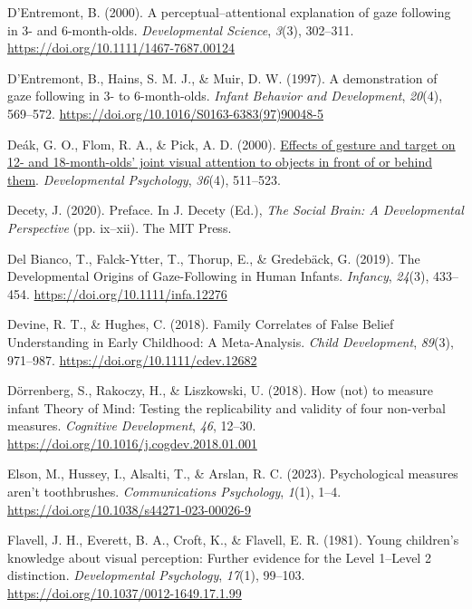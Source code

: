 \documentclass[
]{scrbook}
\newlength{\cslhangindent}
\newenvironment{CSLReferences}[2] %
 {\begin{list}{}{%
  \setlength{\itemindent}{0pt}
  \setlength{\leftmargin}{0pt}
  \setlength{\parsep}{0pt}
  \ifodd #1
   \setlength{\leftmargin}{\cslhangindent}
   \setlength{\itemindent}{-1\cslhangindent}
  \fi
  \setlength{\itemsep}{#2\baselineskip}}}
 {\end{list}}
\begin{document}
\begin{CSLReferences}{1}{0}
D'Entremont, B. (2000). A perceptual--attentional explanation of gaze following in 3- and 6-month-olds. \emph{Developmental Science}, \emph{3}(3), 302--311. \url{https://doi.org/10.1111/1467-7687.00124}

D'Entremont, B., Hains, S. M. J., \& Muir, D. W. (1997). A demonstration of gaze following in 3- to 6-month-olds. \emph{Infant Behavior and Development}, \emph{20}(4), 569--572. \url{https://doi.org/10.1016/S0163-6383(97)90048-5}

Deák, G. O., Flom, R. A., \& Pick, A. D. (2000). \href{https://www.ncbi.nlm.nih.gov/pubmed/10902702}{Effects of gesture and target on 12- and 18-month-olds' joint visual attention to objects in front of or behind them}. \emph{Developmental Psychology}, \emph{36}(4), 511--523.

Decety, J. (2020). Preface. In J. Decety (Ed.), \emph{The {Social Brain}: {A Developmental Perspective}} (pp. ix--xii). The MIT Press.

Del Bianco, T., Falck-Ytter, T., Thorup, E., \& Gredebäck, G. (2019). The {Developmental Origins} of {Gaze-Following} in {Human Infants}. \emph{Infancy}, \emph{24}(3), 433--454. \url{https://doi.org/10.1111/infa.12276}

Devine, R. T., \& Hughes, C. (2018). Family {Correlates} of {False Belief Understanding} in {Early Childhood}: {A Meta-Analysis}. \emph{Child Development}, \emph{89}(3), 971--987. \url{https://doi.org/10.1111/cdev.12682}

Dörrenberg, S., Rakoczy, H., \& Liszkowski, U. (2018). How (not) to measure infant {Theory} of {Mind}: {Testing} the replicability and validity of four non-verbal measures. \emph{Cognitive Development}, \emph{46}, 12--30. \url{https://doi.org/10.1016/j.cogdev.2018.01.001}

Elson, M., Hussey, I., Alsalti, T., \& Arslan, R. C. (2023). Psychological measures aren't toothbrushes. \emph{Communications Psychology}, \emph{1}(1), 1--4. \url{https://doi.org/10.1038/s44271-023-00026-9}

Flavell, J. H., Everett, B. A., Croft, K., \& Flavell, E. R. (1981). Young children's knowledge about visual perception: {Further} evidence for the {Level} 1--{Level} 2 distinction. \emph{Developmental Psychology}, \emph{17}(1), 99--103. \url{https://doi.org/10.1037/0012-1649.17.1.99}


\end{CSLReferences}
\end{document}
